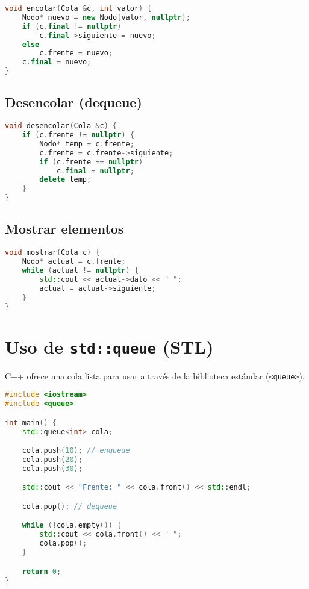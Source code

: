 \documentclass[a4paper]{article}
\begin{document}
\begin{lstlisting}[language=C++]
void encolar(Cola &c, int valor) {
    Nodo* nuevo = new Nodo{valor, nullptr};
    if (c.final != nullptr)
        c.final->siguiente = nuevo;
    else
        c.frente = nuevo;
    c.final = nuevo;
}
\end{lstlisting}

\subsection*{Desencolar (dequeue)}

\begin{lstlisting}[language=C++]
void desencolar(Cola &c) {
    if (c.frente != nullptr) {
        Nodo* temp = c.frente;
        c.frente = c.frente->siguiente;
        if (c.frente == nullptr)
            c.final = nullptr;
        delete temp;
    }
}
\end{lstlisting}

\subsection*{Mostrar elementos}

\begin{lstlisting}[language=C++]
void mostrar(Cola c) {
    Nodo* actual = c.frente;
    while (actual != nullptr) {
        std::cout << actual->dato << " ";
        actual = actual->siguiente;
    }
}
\end{lstlisting}

\section{Uso de \texttt{std::queue} (STL)}

C++ ofrece una cola lista para usar a través de la biblioteca estándar (\texttt{<queue>}).

\begin{lstlisting}[language=C++]
#include <iostream>
#include <queue>

int main() {
    std::queue<int> cola;

    cola.push(10); // enqueue
    cola.push(20);
    cola.push(30);

    std::cout << "Frente: " << cola.front() << std::endl;

    cola.pop(); // dequeue

    while (!cola.empty()) {
        std::cout << cola.front() << " ";
        cola.pop();
    }

    return 0;
}
\end{lstlisting}
\end{document}
